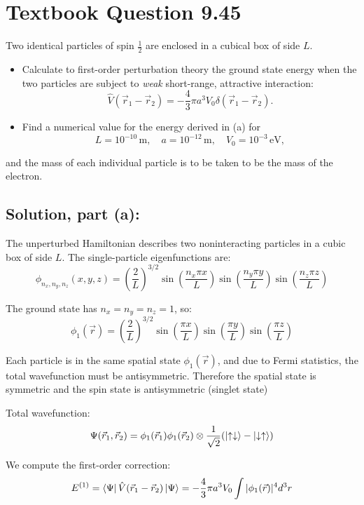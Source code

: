 \documentclass[12pt]{article}
\begin{document}
\section{Textbook Question 9.45}
    Two identical particles of spin \( \frac{1}{2} \) are enclosed in a cubical box of side \( L \). 
    \begin{itemize}
        \item [(a)] Calculate to first-order perturbation theory the ground state energy when the two particles are subject to \textit{weak} short-range, attractive interaction:
        \[
            \hat{V}(\vec{r}_1 - \vec{r}_2) = -\frac{4}{3} \pi a^3 V_0 \delta(\vec{r}_1 - \vec{r}_2).
        \]
        \item [(b)] Find a numerical value for the energy derived in (a) for 
        \[
            L = 10^{-10} \, \text{m}, \quad a = 10^{-12} \, \text{m}, \quad V_0 = 10^{-3} \, \text{eV},
        \]
    \end{itemize}
    and the mass of each individual particle is to be taken to be the mass of the electron.

    \subsection{Solution, part (a):}
        The unperturbed Hamiltonian describes two noninteracting particles in a cubic box of side \( L \). The single-particle eigenfunctions are:
        \[
            \phi_{n_x,n_y,n_z}(x,y,z) = \left( \frac{2}{L} \right)^{3/2} \sin\left( \frac{n_x \pi x}{L} \right) \sin\left( \frac{n_y \pi y}{L} \right) \sin\left( \frac{n_z \pi z}{L} \right)
        \]
        
        The ground state has \( n_x = n_y = n_z = 1 \), so:
        \[
            \phi_1(\vec{r}) = \left( \frac{2}{L} \right)^{3/2} \sin\left( \frac{\pi x}{L} \right) \sin\left( \frac{\pi y}{L} \right) \sin\left( \frac{\pi z}{L} \right)
        \]
        
        Each particle is in the same spatial state \( \phi_1(\vec{r}) \), and due to Fermi statistics, the total wavefunction must be antisymmetric. Therefore the spatial state is symmetric and the spin state is antisymmetric (singlet state)
        
        Total wavefunction:
        \[
            \Psi(\vec{r}_1, \vec{r}_2) = \phi_1(\vec{r}_1)\phi_1(\vec{r}_2) \otimes \frac{1}{\sqrt{2}}(\ket{\uparrow\downarrow} - \ket{\downarrow\uparrow})
        \]
        
        
        We compute the first-order correction:
        \[
            E^{(1)} = \bra{\Psi} \hat{V}(\vec{r}_1 - \vec{r}_2) \ket{\Psi} = -\frac{4}{3} \pi a^3 V_0 \int |\phi_1(\vec{r})|^4 d^3r
        \]
        
\end{document}
